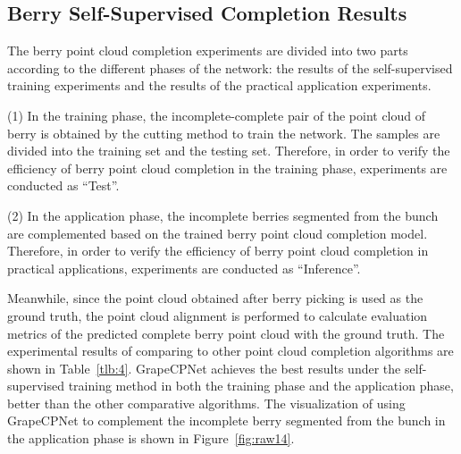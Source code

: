 \documentclass[12pt]{article}
\begin{document}
\subsection{Berry Self-Supervised Completion Results}

The berry point cloud completion experiments are divided into two parts according to the different phases of the network: the results of the self-supervised training experiments and the results of the practical application experiments.

(1) In the training phase, the incomplete-complete pair of the point cloud of berry is obtained by the cutting method to train the network. 
The samples are divided into the training set and the testing set. Therefore, in order to verify the efficiency of berry point cloud completion in the training phase, experiments are conducted as ``Test''.

(2) In the application phase, the incomplete berries segmented from the bunch are complemented based on the trained berry point cloud completion model. 
Therefore, in order to verify the efficiency of berry point cloud completion in practical applications, experiments are conducted as ``Inference''. 


Meanwhile, since the point cloud obtained after berry picking is used as the ground truth, the point cloud alignment is performed to calculate evaluation metrics of the predicted complete berry point cloud with the ground truth.
The experimental results of comparing to other point cloud completion algorithms are shown in Table~\ref{tlb:4}. 
GrapeCPNet achieves the best results under the self-supervised training method in both the training phase and the application phase, better than the other comparative algorithms. 
The visualization of using GrapeCPNet to complement the incomplete berry segmented from the bunch in the application phase is shown in Figure~\ref{fig:raw14}.
\end{document}
